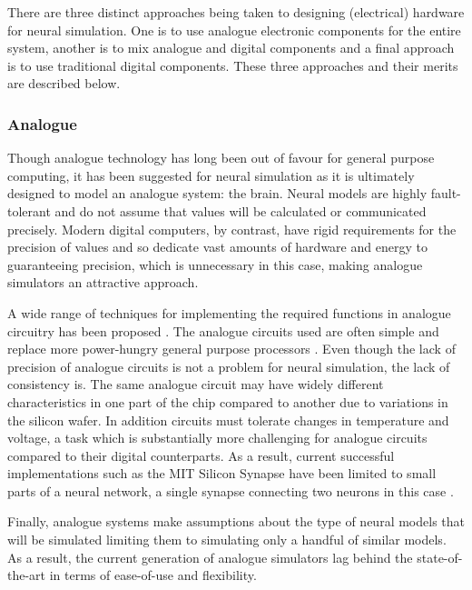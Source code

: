 			There are three distinct approaches being taken to designing (electrical)
			hardware for neural simulation. One is to use analogue electronic components
			for the entire system, another is to mix analogue and digital components and
			a final approach is to use traditional digital components. These three
			approaches and their merits are described below.
			
			\subsubsection{Analogue}
			
				Though analogue technology has long been out of favour for general
				purpose computing, it has been suggested for neural simulation as it is
				ultimately designed to model an analogue system: the brain. Neural
				models are highly fault-tolerant and do not assume that values will be
				calculated or communicated precisely. Modern digital computers, by
				contrast, have rigid requirements for the precision of values and so
				dedicate vast amounts of hardware and energy to guaranteeing precision,
				which is unnecessary in this case, making analogue simulators an
				attractive approach.
				
				A wide range of techniques for implementing the required functions in
				analogue circuitry has been proposed
				\cite{graf86,holler89,agranat90,azghadi13}. The analogue circuits used
				are often simple and replace more power-hungry general purpose
				processors \cite{misra10}. Even though the lack of precision of analogue
				circuits is not a problem for neural simulation, the lack of consistency
				is. The same analogue circuit may have widely different characteristics
				in one part of the chip compared to another due to variations in the
				silicon wafer. In addition circuits must tolerate changes in temperature
				and voltage, a task which is substantially more challenging for analogue
				circuits compared to their digital counterparts. As a result, current
				successful implementations such as the MIT Silicon Synapse have been
				limited to small parts of a neural network, a single synapse connecting
				two neurons in this case \cite{rachmuth11}.
				
				Finally, analogue systems make assumptions about the type of neural models
				that will be simulated limiting them to simulating only a handful of
				similar models. As a result, the current generation of analogue
				simulators lag behind the state-of-the-art in terms of ease-of-use and
				flexibility.
			
